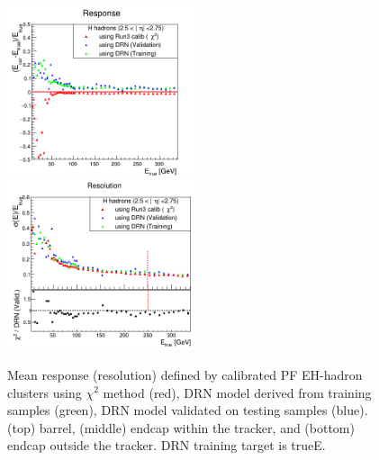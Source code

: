 \begin{figure}
\includegraphics[width=0.495\textwidth]{./plots_pdf/HCAL_plots/Trained_target_ratioflip_0_500_10/pdf/H_ec_out/EC_outside_tracker_corrEtaEndcapHcal.png}
\includegraphics[width=0.495\textwidth]{./plots_pdf/HCAL_plots/Trained_target_ratioflip_0_500_10/pdf/H_ec_out/EC_outside_tracker_corrEtaEndcapHcal_reso.png}
\caption[Response (resolution) vs. \pt of the PF H-hadron cluster - traget trueE]{Mean response (resolution) defined by calibrated PF EH-hadron clusters using $\chi^{2}$ method (red), DRN model derived from training samples (green), DRN model validated on testing samples (blue). (top) barrel, (middle) endcap within the tracker, and (bottom) endcap outside the tracker. DRN training target is trueE.}
\label{fig:H_trueE}
\end{figure}
